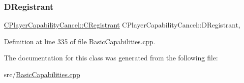 \subsubsection{\texorpdfstring{D\+Registrant}{DRegistrant}}
{\footnotesize\ttfamily \hyperlink{classCPlayerCapabilityCancel_1_1CRegistrant}{C\+Player\+Capability\+Cancel\+::\+C\+Registrant} C\+Player\+Capability\+Cancel\+::\+D\+Registrant\hspace{0.3cm}{\ttfamily [static]}, {\ttfamily [protected]}}



Definition at line 335 of file Basic\+Capabilities.\+cpp.



The documentation for this class was generated from the following file\+:\begin{DoxyCompactItemize}
\item 
src/\hyperlink{BasicCapabilities_8cpp}{Basic\+Capabilities.\+cpp}\end{DoxyCompactItemize}
